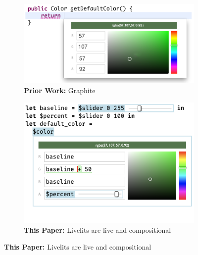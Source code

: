 \begin{figure}
  \begin{minipage}[t]{0.38\textwidth}
    \begin{subfigure}[t]{\linewidth}
    \begin{snugshade}
      \vspace*{-2mm}
      \caption{\textbf{Prior Work:} Graphite \cite{Graphite}}
       \label{fig:graphite}
      \vspace*{1mm}
     \end{snugshade}
      \vspace*{-1mm}
      \includegraphics[width=\linewidth]{graphite-color-palette-green.png}
      \vspace*{-5mm}
    \end{subfigure}
    \hspace{8mm}
    \begin{subfigure}[t]{\linewidth}
     \begin{snugshade}
      \vspace*{-2mm}
      \caption{\textbf{This Paper:} Livelits are live and compositional}
    \label{fig:color}
      \vspace*{1mm}
     \end{snugshade}
      \vspace*{-1mm}
      \includegraphics[width=\linewidth]{slider-color-livelits.png}

\end{subfigure}
\end{minipage}
\end{figure}
